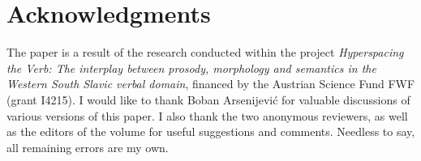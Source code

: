 \documentclass[output=paper,colorlinks,citecolor=brown]{langscibook}
\begin{document}
\section*{Acknowledgments}
The paper is a result of the research conducted within the project \textit{Hyperspacing the Verb: The interplay between prosody, morphology and semantics in the Western South Slavic verbal domain}, financed by the Austrian Science Fund FWF (grant I4215). I would like to thank Boban Arsenijević for valuable discussions of various versions of this paper. I also thank the two anonymous reviewers, as well as the editors of the volume for useful suggestions and comments. Needless to say, all remaining errors are my own.

\printbibliography[heading=subbibliography,notkeyword=this]
\end{document}
